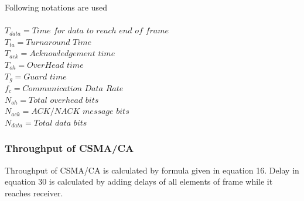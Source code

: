 \documentclass[11pt, conference, compsocconf, onecolumn]{IEEEtran}
\begin{document}
Following notations are used
\\\\
$T_{data}=Time$ $for$ $data$ $to$ $reach$ $end$ $of$ $frame$
\\
$T_{ta}=Turnaround$ $Time$
\\
$T_{ack}=Acknowledgement$ $time$
\\
$T_{oh}=OverHead$ $time$
\\
$T_{g}=Guard$ $time$
\\
$f_{c}= Communication$ $Data$ $Rate$
\\
$N_{oh}=Total$ $overhead$ $bits$
\\
$N_{ack}=ACK/NACK$ $message$ $bits$
\\
$N_{data}=Total$ $data$ $bits$
\\
\subsubsection{Throughput of CSMA/CA}

Throughput of CSMA/CA is calculated by formula given in equation 16. Delay in equation 30 is calculated by adding delays of all elements of frame while it reaches receiver.
\end{document}
